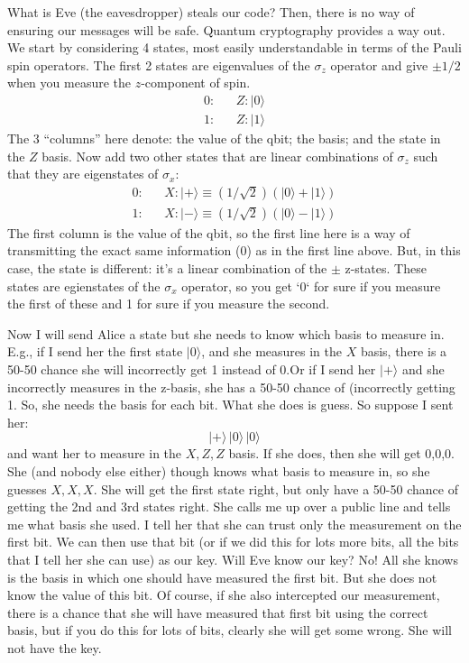 \documentclass[prd,amsmath,aps,floats,amssymb, floatfix,
  superscriptaddress,nofootinbib]{revtex4-1}
\def\vs{\nonumber\\}
\numberwithin{equation}{section}
\newcommand\be{\begin{equation}}
\newcommand\ee{\end{equation}}
\def\bea{\begin{eqnarray}}
\def\eea{\end{eqnarray}}
\begin{document}
What is Eve (the eavesdropper) steals our code? Then, there is no way of ensuring our messages will be safe. Quantum cryptography provides a way out. We start by considering 4 states, most easily understandable in terms of the Pauli spin operators. The first 2 states are eigenvalues of the $\sigma_z$ operator and give $\pm1/2$ when you measure the $z$-component of spin. 
\bea
0: && Z:|0\rangle
\vs
1: &&Z:|1\rangle\eea
The 3 ``columns'' here denote: the value of the qbit; the basis; and the state in the $Z$ basis.
Now add two other states that are linear combinations of $\sigma_z$ such that they are eigenstates of $\sigma_x$:
\bea
0: && X:|+\rangle\equiv (1/\sqrt{2})\left( |0\rangle + |1\rangle\right)
\vs
1: && X:|-\rangle\equiv (1/\sqrt{2})\left( |0\rangle - |1\rangle\right)
\eea
The first column is the value of the qbit, so the first line here is a way of transmitting the exact same information (0) as in the first line above. But, in this case, the state is different: it's a linear combination of the $\pm$ z-states. These states are egienstates of the $\sigma_x$ operator, so you get `0` for sure if you measure the first of these and 1 for sure if you measure the second.

Now I will send Alice a state but she needs to know which basis to measure in. E.g., if I send her the first state $|0\rangle$, and she measures in the $X$ basis, there is a 50-50 chance she will incorrectly get 1 instead of 0.Or if I send her $|+\rangle$ and she incorrectly measures in the z-basis, she has a 50-50 chance of (incorrectly getting 1. So, she needs the basis for each bit. What she does is guess. So suppose I sent her:
\be
|+\rangle\, |0\rangle\, |0\rangle
\ee
 and want her to measure in the $X,Z,Z$ basis. If she does, then she will get 0,0,0. She (and nobody else either) though knows what basis to measure in, so she guesses $X,X,X$. She will get the first state right, but only have a 50-50 chance of getting the 2nd and 3rd states right. She calls me up over a public line and tells me what basis she used. I tell her that she can trust only the measurement on the first bit. We can then use that bit (or if we did this for lots more bits, all the bits that I tell her she can use) as our key. Will Eve know our key? No! All she knows is the basis in which one should have measured the first bit. But she does not know the value of this bit. Of course, if she also intercepted our measurement, there is a chance that she will have measured that first bit using the correct basis, but if you do this for lots of bits, clearly she will get some wrong. She will not have the key.

 
\end{document}
